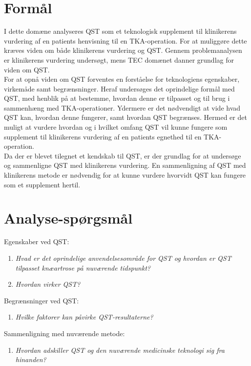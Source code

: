 \section{Formål} 
I dette domæne analyseres QST som et teknologisk supplement til klinikerens vurdering af en patients henvisning til en TKA-operation. For at muliggøre dette kræves viden om både klinikerens vurdering og QST. Gennem problemanalysen er klinikerens vurdering undersøgt, mens TEC domænet danner grundlag for viden om QST.\\
For at opnå viden om QST forventes en forståelse for teknologiens egenskaber, virkemåde samt begrænsninger. Heraf undersøges det oprindelige formål med QST, med henblik på at bestemme, hvordan denne er tilpasset og til brug i sammenhæng med TKA-operationer. Ydermere er det nødvendigt at vide hvad QST kan, hvordan denne fungerer, samt hvordan QST begrænses. Hermed er det muligt at vurdere hvordan og i hvilket omfang QST vil kunne fungere som supplement til klinikerens vurdering af en patients egnethed til en TKA-operation.\\
Da der er blevet tilegnet et kendskab til QST, er der grundlag for at undersøge og sammenligne QST med klinikerens vurdering. En sammenligning af QST med klinikerens metode er nødvendig for at kunne vurdere hvorvidt QST kan fungere som et supplement hertil. 

\section{Analyse-spørgsmål}
Egenskaber ved QST:
\begin{enumerate}
	\item \textit{Hvad er det oprindelige anvendelsesområde for QST og hvordan er QST tilpasset knæartrose på nuværende tidspunkt?} %
	\item \textit{Hvordan virker QST?}  %
\end{enumerate}
Begrænsninger ved QST:
\begin{enumerate}[resume]
	\item \textit{Hvilke faktorer kan påvirke QST-resultaterne?}
\end{enumerate}
Sammenligning med nuværende metode:
\begin{enumerate}[resume]
	\item \textit{Hvordan adskiller QST og den nuværende medicinske teknologi sig fra hinanden?} %
\end{enumerate}

